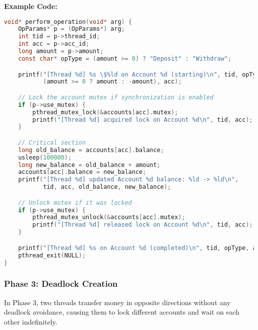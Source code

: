 \documentclass[11pt]{article}
\begin{document}
\textbf{Example Code:}
\begin{lstlisting}[language=C]
void* perform_operation(void* arg) {
    OpParams* p = (OpParams*) arg;
    int tid = p->thread_id;
    int acc = p->acc_id;
    long amount = p->amount;
    const char* opType = (amount >= 0) ? "Deposit" : "Withdraw";

    printf("[Thread %d] %s \$%ld on Account %d (starting)\n", tid, opType,
           (amount >= 0 ? amount : -amount), acc);

    // Lock the account mutex if synchronization is enabled
    if (p->use_mutex) {
        pthread_mutex_lock(&accounts[acc].mutex);
        printf("[Thread %d] acquired lock on Account %d\n", tid, acc);
    }

    // Critical section
    long old_balance = accounts[acc].balance;
    usleep(100000);
    long new_balance = old_balance + amount;
    accounts[acc].balance = new_balance;
    printf("[Thread %d] updated Account %d balance: %ld -> %ld\n",
           tid, acc, old_balance, new_balance);

    // Unlock mutex if it was locked
    if (p->use_mutex) {
        pthread_mutex_unlock(&accounts[acc].mutex);
        printf("[Thread %d] released lock on Account %d\n", tid, acc);
    }

    printf("[Thread %d] %s on Account %d (completed)\n", tid, opType, acc);
    pthread_exit(NULL);
}
\end{lstlisting}

\subsubsection{Phase 3: Deadlock Creation}
In Phase 3, two threads transfer money in opposite directions without any deadlock avoidance, causing them to lock different accounts and wait on each other indefinitely.
\end{document}
